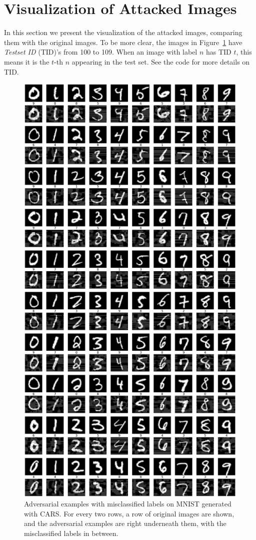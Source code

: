 \section{Visualization of Attacked Images}
In this section we present the visualization of the attacked images, comparing them with the original images.
To be more clear, the images in Figure~\ref{fig:MNIST_ATK_RES_ALL} have {\em Testset ID} (TID)'s from 100 to 109.
When an image with label $n$ has TID $t$, this means it is the $t$-th $n$ appearing in the test set. See the code for more details on TID.
\begin{figure}[t]
    \centering
    \includegraphics[width=0.60\linewidth]{fig/fig_CARS/MNISTatk_imgs.png}
    \caption{Adversarial examples with misclassified labels on MNIST generated with CARS. For every two rows, a row of original images are shown, and the adversarial examples are right underneath them, with the misclassified labels in between.}
    \label{fig:MNIST_ATK_RES_ALL}
\end{figure}